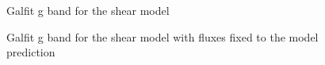 \documentclass[manuscript]{aastex}
\begin{document}
\begin{figure}
\caption{
Galfit g band for the shear model}
\label{galfitgshear}
\end{figure}

\begin{figure}
\caption{
Galfit g band for the shear model with fluxes fixed to the model prediction}
\label{galfitg}
\end{figure}
\end{document}
